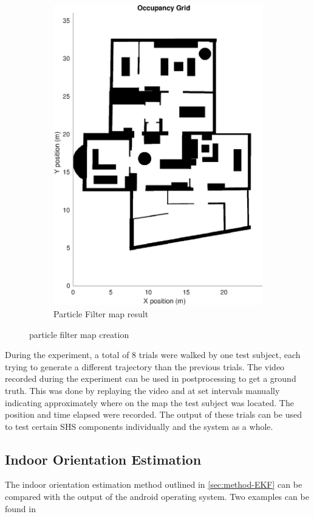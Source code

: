 \begin{figure}[H]
\begin{subfigure}[t]{.3\textwidth}
	\includegraphics[width=0.9\linewidth]{images/20201030_1157_pf_map_1}
	\caption{Particle Filter map result}
	\label{fig:pf_map}
\end{subfigure}
\label{fig:particle_map_construction}
\caption{particle filter map creation}
\end{figure}

During the experiment, a total of 8 trials were walked by one test subject, each trying to generate a different trajectory than the previous trials. The video recorded during the experiment can be used in postprocessing to get a ground truth. This was done by replaying the video and at set intervals manually indicating approximately where on the map the test subject was located. The position and time elapsed were recorded. The output of these trials can be used to test certain SHS components individually and the system as a whole.



\subsection{Indoor Orientation Estimation}
The indoor orientation estimation method outlined in \cref{sec:method-EKF} can be compared with the output of the android operating system. Two examples can be found in 

